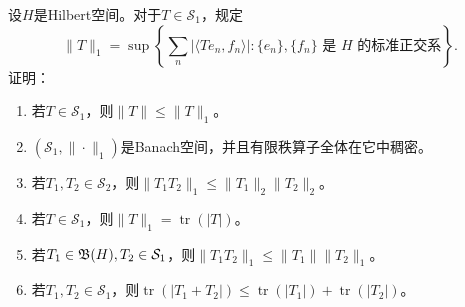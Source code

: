 \begin{7}
    设$H$是Hilbert空间。对于$T\in\mathcal{S}_1$，规定
    \[\|T\|_1=\sup\left\{\sum_n|\langle Te_n,f_n \rangle|:
    \{e_n\},\{f_n\}\text{ 是 }H\text{ 的标准正交系}\right\}.\]
    证明：
    \begin{enumerate}[label=(\roman*)]
    \item 若$T\in\mathcal{S}_1$，则$\|T\|\leqslant\|T\|_1$。
    \item $(\mathcal{S}_1,\|\cdot\|_1)$是Banach空间，并且有限秩算子全体在它中稠密。
    \item 若$T_1,T_2\in\mathcal{S_2}$，则$\|T_1T_2\|_1\leqslant\|T_1\|_2\|T_2\|_2$。
    \item 若$T\in\mathcal{S}_1$，则$\|T\|_1=\operatorname{tr}(|T|)$。
    \item 若$T_1\in\mathfrak{B}(H),T_2\in\mathcal{S}_1$，则$\|T_1T_2\|_1\leqslant\|T_1\|\|T_2\|_1$。
    \item 若$T_1,T_2\in\mathcal{S}_1$，则$\operatorname{tr}(|T_1+T_2|)
    \leqslant\operatorname{tr}(|T_1|)+\operatorname{tr}(|T_2|)$。
    \end{enumerate}
\end{7}
